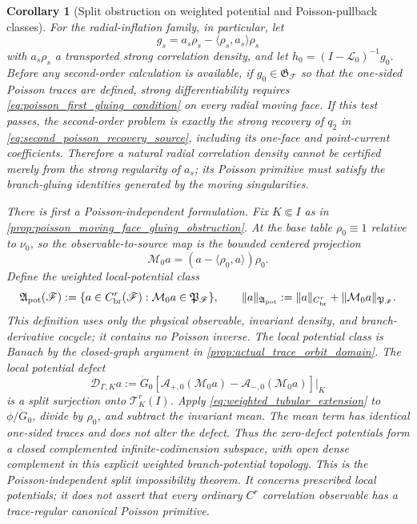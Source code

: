 \documentclass[11pt]{amsart}
\theoremstyle{compactplain}
\newtheorem{corollary}[theorem]{Corollary}
\theoremstyle{compactdefinition}
\theoremstyle{compactremark}
\newcommand{\Ltransfer}{\mathscr L}
\begin{document}
\begin{corollary}[Split obstruction on weighted potential and Poisson-pullback classes]
\label{cor:prescribed_correlation_observable_split_obstruction}
For the radial-inflation family, in particular, let
\[
 g_s=a_s\rho_s-\langle\rho_s,a_s\rangle\rho_s
\]
with \(a_s\rho_s\) a transported strong correlation density, and let
\(h_0=(I-\Ltransfer_0)^{-1}g_0\).  Before any second-order calculation is
available, if
\(g_0\in\mathfrak G_{\mathscr F}\) so that the one-sided
Poisson traces are defined, strong differentiability requires
\eqref{eq:poisson_first_gluing_condition} on every radial moving face.  If
this test passes, the second-order problem is exactly the strong recovery of
\(q_2\) in \eqref{eq:second_poisson_recovery_source}, including its one-face
and point-current coefficients.  Therefore a natural radial correlation
density cannot be certified merely from the strong regularity of \(a_s\); its
Poisson primitive must satisfy the branch-gluing identities generated by the
moving singularities.

There is first a Poisson-independent formulation.  Fix \(K\Subset I\) as in
\cref{prop:poisson_moving_face_gluing_obstruction}.  At the base table
\(\rho_0\equiv1\) relative to \(\nu_0\), so the
observable-to-source map is the bounded centered projection
\[
 \mathcal M_0a=(a-\langle\rho_0,a\rangle)\rho_0.
\]
Define the weighted local-potential class
\begin{equation}
\label{eq:weighted_potential_observable_domain}
 \mathfrak A_{\rm pot}(\mathscr F)
 :=\{a\in C_{\rm br}^r(\mathscr F):
       \mathcal M_0a\in\mathfrak P_{\mathscr F}\},
 \qquad
 \|a\|_{\mathfrak A_{\rm pot}}
 :=\|a\|_{C_{\rm br}^r}+\|\mathcal M_0a\|_{\mathfrak P_{\mathscr F}}.
\end{equation}
This definition uses only the physical observable, invariant density, and
branch-derivative cocycle; it contains no Poisson inverse.  The local potential
class is Banach by the closed-graph argument in
\cref{prop:actual_trace_orbit_domain}.  The local potential
defect
\[
 \mathcal D_{\Gamma,K}a
 :=\dot G_0[\mathcal A_{+,0}(\mathcal M_0a)
             -\mathcal A_{-,0}(\mathcal M_0a)]\big|_K
\]
is a split surjection onto \(\mathcal T_K^r(I)\).  Apply
\eqref{eq:weighted_tubular_extension} to \(\phi/\dot G_0\), divide by
\(\rho_0\), and subtract the invariant mean.  The mean term has identical
one-sided traces and does not alter the defect.  Thus the zero-defect
potentials form a closed complemented infinite-codimension subspace, with open
dense complement in this explicit weighted branch-potential topology.  This
is the Poisson-independent split impossibility theorem.  It concerns
prescribed local potentials; it does not assert that every ordinary \(C^r\)
correlation observable has a trace-regular canonical Poisson primitive.


\end{corollary}
\end{document}
